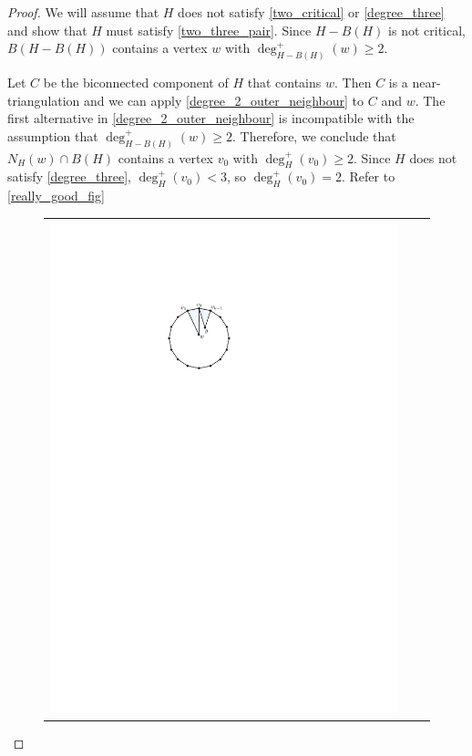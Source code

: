 \documentclass{article}
\theoremstyle{definition}
\begin{document}
\begin{proof}
  We will assume that $H$ does not satisfy \cref{two_critical} or \cref{degree_three} and show that $H$ must satisfy \cref{two_three_pair}.  Since $H-B(H)$ is not critical, $B(H-B(H))$ contains a vertex $w$ with $\deg^+_{H-B(H)}(w)\ge 2$.

  Let $C$ be the biconnected component of $H$ that contains $w$.  Then $C$ is a near-triangulation and we can apply \cref{degree_2_outer_neighbour} to $C$ and $w$. The first alternative in \cref{degree_2_outer_neighbour} is incompatible with the assumption that $\deg^+_{H-B(H)}(w)\ge 2$.  Therefore, we conclude that $N_H(w)\cap B(H)$ contains a vertex $v_0$ with $\deg^+_H(v_0)\ge 2$.  Since $H$ does not satisfy \cref{degree_three}, $\deg^+_H(v_0)< 3$, so $\deg^+_H(v_0)=2$.  Refer to \cref{really_good_fig}
  \begin{figure}
    \centering
    \begin{tabular}{ccc}
      \includegraphics[page=1]{figs/really_good} &

\end{tabular}
\end{figure}
\end{proof}
\end{document}
